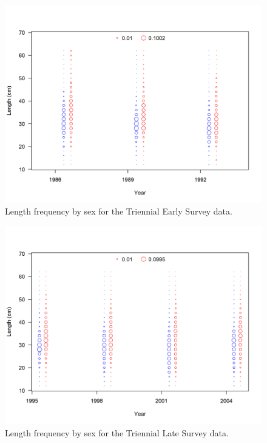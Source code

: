 \documentclass[12pt,]{article}
\begin{document}
\FloatBarrier

\begin{figure}
\centering
\includegraphics{r4ss/plots_mod1/comp_lendat_bubflt5mkt0.png}
\caption{Length frequency by sex for the Triennial Early Survey data.
\label{fig:tri_early_len_freq}}
\end{figure}

\FloatBarrier

\begin{figure}
\centering
\includegraphics{r4ss/plots_mod1/comp_lendat_bubflt6mkt0.png}
\caption{Length frequency by sex for the Triennial Late Survey data.
\label{fig:tri_late_len_freq}}
\end{figure}
\end{document}
